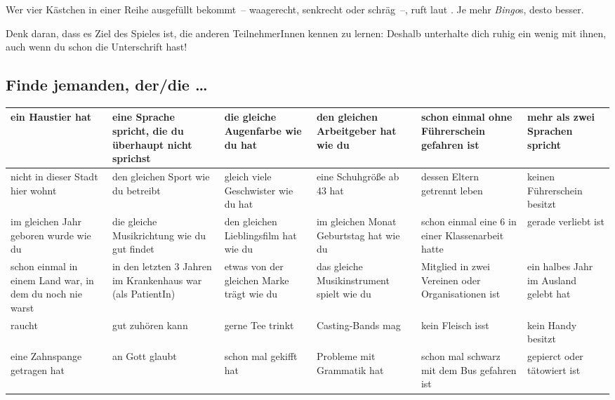 Wer vier Kästchen in einer Reihe ausgefüllt bekommt~-- waagerecht, senkrecht oder schräg~--, ruft laut . Je mehr \emph{Bingo}s, desto besser.

Denk daran, dass es Ziel des Spieles ist, die anderen TeilnehmerInnen kennen zu lernen: Deshalb unterhalte dich ruhig ein wenig mit ihnen, auch wenn du schon die Unterschrift hast!

\subsection*{Finde jemanden, der/die \ldots}

\renewcommand{\arraystretch}{1.27}
\noindent\begin{tabular}{|p{5.8em}|p{5.8em}|p{5.8em}|p{5.8em}|p{5.8em}|p{5.8em}|}
\hline

ein Haustier hat &
eine Sprache spricht, die du überhaupt nicht sprichst \vspace{1.5em} &
die gleiche Augenfarbe wie du hat &
den gleichen Arbeitgeber hat wie du &
schon einmal ohne Führerschein gefahren ist &
mehr als zwei Sprachen spricht \\
\hline

nicht in dieser Stadt hier wohnt \vspace{1.5em} &
den gleichen Sport wie du betreibt &
gleich viele Geschwister wie du hat &
eine Schuhgröße ab 43 hat &
dessen Eltern getrennt leben &
keinen Führerschein besitzt \\
\hline

im gleichen Jahr geboren wurde wie du &
die gleiche Musikrichtung wie du gut findet \vspace{1.5em} &
den gleichen Lieblingsfilm hat wie du &
im gleichen Monat Geburtstag hat wie du &
schon einmal eine 6 in einer Klassenarbeit hatte &
gerade verliebt ist \\
\hline

schon einmal in einem Land war, in dem du noch nie warst &
in den letzten 3 Jahren im Krankenhaus war (als PatientIn) \vspace{1.5em} &
etwas von der gleichen Marke trägt wie du &
das gleiche Musikinstrument spielt wie du &
Mitglied in zwei Vereinen oder Organisationen ist &
ein halbes Jahr im Ausland gelebt hat \\
\hline

raucht &
gut zuhören kann &
gerne Tee trinkt &
Casting-Bands mag \vspace{1.5em} &
kein Fleisch isst &
kein Handy besitzt \\
\hline

eine Zahnspange getragen hat &
an Gott glaubt &
schon mal gekifft hat &
Probleme mit Grammatik hat &
schon mal schwarz mit dem Bus gefahren ist \vspace{1.5em} &
gepierct oder tätowiert ist \\
\hline

\end{tabular}
\renewcommand{\arraystretch}{1.0}

